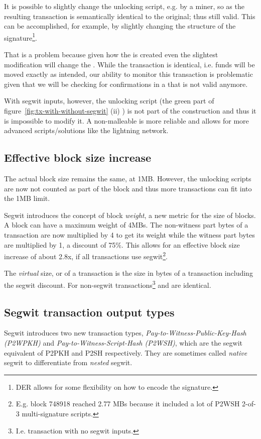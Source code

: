 It is possible to slightly change the unlocking script, e.g. by a miner, so as the resulting transaction is semantically identical to the original; thus still valid. This can be accomplished, for example, by slightly changing the structure of the signature\footnote{DER allows for some flexibility on how to encode the signature.}.

That is a problem because given how the  is created even the slightest modification will change the . While the transaction is identical, i.e. funds will be moved exactly as intended, our ability to monitor this transaction is problematic given that we will be checking for confirmations in a  that is not valid anymore.

With segwit inputs, however, the unlocking script (the green part of figure~\ref{fig:tx-with-without-segwit} (ii) ) is not part of the  construction and thus it is impossible to modify it. A non-malleable  is more reliable and allows for more advanced scripts/solutions like the lightning network.


\subsection*{Effective block size increase}
The actual block size remains the same, at 1MB. However, the unlocking scripts are now not counted as part of the block and thus more transactions can fit into the 1MB limit.

Segwit introduces the concept of block \emph{weight}, a new metric for the size of blocks. A block can have a maximum weight of 4MBs. The non-witness part bytes of a transaction are now multiplied by 4 to get its weight while the witness part bytes are multiplied by 1, a discount of 75\%. This allows for an effective block size increase of about 2.8x, if all transactions use segwit\footnote{E.g. block 748918 reached 2.77 MBs because it included a lot of P2WSH 2-of-3 multi-signature scripts.}.

The \emph{virtual} size, or  of a transaction is the size in bytes of a transaction including the segwit discount. For non-segwit transactions\footnote{I.e. transaction with no segwit inputs.}  and  are identical.


\subsection*{Segwit transaction output types}
Segwit introduces two new transaction types, \emph{Pay-to-Witness-Public-Key-Hash (P2WPKH)} and \emph{Pay-to-Witness-Script-Hash (P2WSH)}, which are the segwit equivalent of P2PKH and P2SH respectively. They are sometimes called \emph{native} segwit to differentiate from \emph{nested} segwit.

